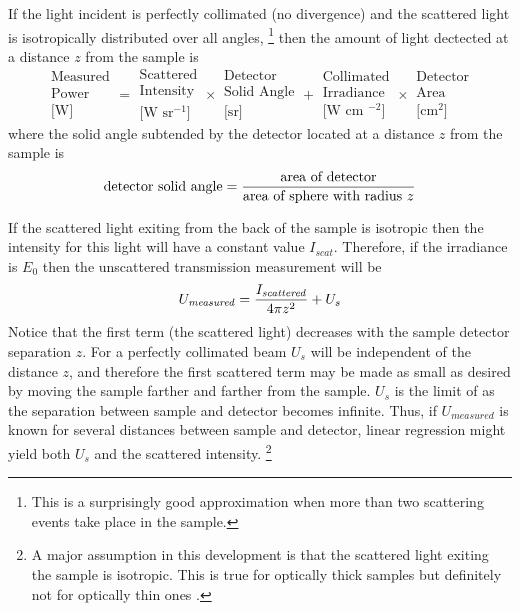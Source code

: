 \documentclass{article}
\begin{document}
If the light incident is perfectly collimated (no divergence) and the
scattered light is isotropically distributed over all angles,%
\footnote{This is a surprisingly good approximation when
more than two scattering events take place in the sample.} then the
amount of light dectected at a distance $z$ from the sample is
\def\sa{\begin{array}{c}}
\def\ea{\end{array} }
$$
\sa\mbox{Measured}   \\ \mbox{Power}      \\ \mbox{[W]}           \ea =
\sa\mbox{Scattered}  \\ \mbox{Intensity}  \\ \mbox{[W sr$^{-1}$]} \ea \times
\sa\mbox{Detector}   \\ \mbox{Solid Angle}\\ \mbox{[sr]}          \ea +
\sa\mbox{Collimated} \\ \mbox{Irradiance} \\ \mbox{[W cm $^{-2}$]}\ea \times
\sa\mbox{Detector}   \\ \mbox{Area}\\ \mbox{[cm$^2$]}      \ea
$$
where the
solid angle subtended by the detector located at a distance $z$ from the
sample is
$$
\mbox{detector solid angle}=
	{\mbox{area of detector}\over\mbox{area of sphere with radius $z$}}
$$

If the scattered light exiting from the back of the sample is isotropic
then the intensity  for this light will have a constant value $I_\mathit{scat}$.  
Therefore, if the irradiance is $E_0$ then the unscattered transmission
measurement will be 
$$
U_{\mathit{measured}}=
	{I_{\mathit{scattered}}\over 4\pi z^2 } + U_s
$$
Notice that the first term (the scattered light) decreases with the sample
detector separation $z$. For a perfectly collimated beam $U_s$ will be
independent of the distance $z$, and therefore
the first scattered term may be made as small as desired by moving the sample
farther and farther from the sample. 
$U_s$ is the limit of as the separation between sample and
detector becomes infinite.   Thus, if $U_{\mathit{measured}}$ is known for
several distances between sample and detector, linear regression might
yield both $U_s$ and the scattered intensity.%
\footnote{
A major assumption in this development is that the scattered light
exiting the sample is isotropic.  This is true for optically thick samples
but definitely not for  optically thin ones \cite{jacques87b}.}

\clearpage
\end{document}
